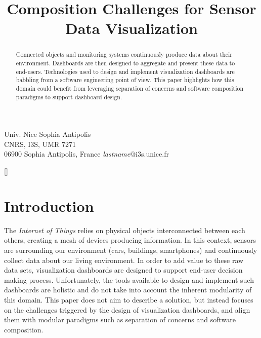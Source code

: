 \documentclass{sigplanconf}
\begin{document}
\setlength{\pdfpageheight}{\paperheight}
\setlength{\pdfpagewidth}{\paperwidth}



\title{Composition Challenges for Sensor Data Visualization}

  		   {Univ. Nice Sophia Antipolis\\CNRS, I3S, UMR 7271\\06900 Sophia Antipolis, France}
  		   {\emph{lastname}@i3s.unice.fr}
\maketitle

\begin{abstract}
  Connected objects and monitoring systems continuously produce
  data about their environment. Dashboards are then designed to
  aggregate and present these data to end-users.
  Technologies used to design and implement visualization dashboards
  are babbling from a software engineering point of view. This paper
  highlights how this domain could benefit from leveraging separation
  of concerns and software composition paradigms to support dashboard design.
\end{abstract}

[]


\section{Introduction}

The \emph{Internet of Things} relies on physical objects interconnected
between each others, creating a mesh of devices producing
information. In this context, sensors are surrounding our environment
(\eg cars, buildings, smartphones) and continuously collect data about
our living environment. In order to add value to these raw data sets,
visualization dashboards are designed to support end-user decision
making process. Unfortunately, the tools available to design and
implement such dashboards are holistic and do not take into account
the inherent modularity of this domain. This paper does not aim to
describe a solution, but instead focuses on the challenges triggered
by the design of visualization dashboards, and align them with
modular paradigms such as separation of concerns and software
composition.
\end{document}
